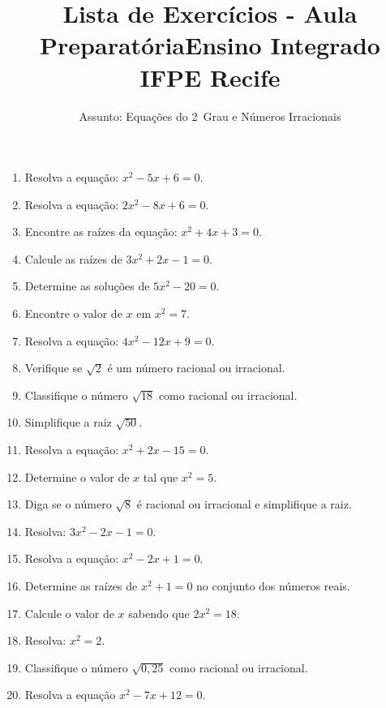 \documentclass[12pt,a4paper]{article}
\title{Lista de Exerc\'icios - Aula Preparat\'oria\linebreak Ensino Integrado IFPE Recife}
\author{Assunto: Equa\c{c}\~oes do 2\textordfeminine\ Grau e N\'umeros Irracionais}
\date{\vspace{-5ex}}
\begin{document}
\maketitle

\begin{enumerate}

\item Resolva a equa\c{c}\~ao: $x^2 - 5x + 6 = 0$.

\item Resolva a equa\c{c}\~ao: $2x^2 - 8x + 6 = 0$.

\item Encontre as ra\'izes da equa\c{c}\~ao: $x^2 + 4x + 3 = 0$.

\item Calcule as ra\'izes de $3x^2 + 2x - 1 = 0$.

\item Determine as solu\c{c}\~oes de $5x^2 - 20 = 0$.

\item Encontre o valor de $x$ em $x^2 = 7$.

\item Resolva a equa\c{c}\~ao: $4x^2 - 12x + 9 = 0$.

\item Verifique se $\sqrt{2}$ \'e um n\'umero racional ou irracional.

\item Classifique o n\'umero $\sqrt{18}$ como racional ou irracional.

\item Simplifique a raiz $\sqrt{50}$.

\item Resolva a equa\c{c}\~ao: $x^2 + 2x - 15 = 0$.

\item Determine o valor de $x$ tal que $x^2 = 5$.

\item Diga se o n\'umero $\sqrt{8}$ \'{e} racional ou irracional e simplifique a raiz.

\item Resolva: $3x^2 - 2x - 1 = 0$.

\item Resolva a equa\c{c}\~ao: $x^2 - 2x + 1 = 0$.

\item Determine as ra\'izes de $x^2 + 1 = 0$ no conjunto dos n\'umeros reais.

\item Calcule o valor de $x$ sabendo que $2x^2 = 18$.

\item Resolva: $x^2 = 2$.

\item Classifique o n\'umero $\sqrt{0,25}$ como racional ou irracional.

\item Resolva a equa\c{c}\~ao $x^2 - 7x + 12 = 0$.

\end{enumerate}
\end{document}
